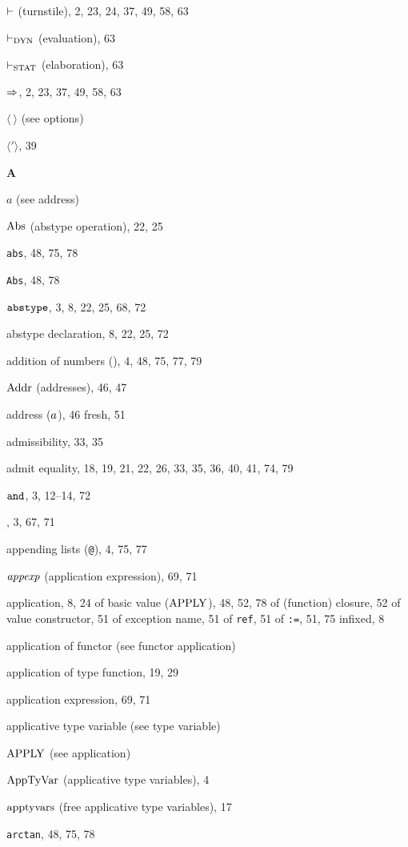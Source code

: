 \begin{theindex}
\item $\vdash$ (turnstile), 2, 23, 24, 37, 49, 58, 63
\item $\vdash_{\rm DYN}$ (evaluation), 63
\item $\vdash_{\rm STAT}$ (elaboration), 63
\item $\Rightarrow$, 2, 23, 37, 49, 58, 63
\item $\langle\ \rangle$ (see options) 
\item $\langle'\rangle$, 39
\indexspace
\parbox{65mm}{\hfil{\large\bf A}\hfil}
\indexspace
\item $a$ (see address) 
\item $\mathop{\rm Abs}\nolimits$ (abstype operation), 22, 25
\item {\tt abs}, 48, 75, 78
\item {\tt Abs}, 48, 78
\item ${\tt abstype}$, 3, 8, 22, 25, 68, 72
\item abstype declaration, 8, 22, 25, 72
\item addition of numbers (\ml{+}), 4, 48, 75, 77, 79
\item ${\rm Addr}$ (addresses), 46, 47
\item address ($a$), 46
\subitem fresh, 51
\item admissibility, 33, 35
\item admit equality, 18, 19, 21, 22, 26, 33, 35, 36, 40, 41, 74, 79
\item ${\tt and}$, 3, 12--14, 72
\item \ANDALSO, 3, 67, 71
\item appending lists (\verb+@+), 4, 75, 77
\item ${\it appexp}$ (application expression), 69, 71
\item application, 8, 24
\subitem of basic value (${\rm APPLY}$), 48, 52, 78
\subitem of (function) closure, 52
\subitem of value constructor, 51
\subitem of exception name, 51
\subitem of {\tt ref}, 51
\subitem of {\tt :=}, 51, 75
\subitem infixed, 8
\item application of functor (see functor application) 
\item application of type function, 19, 29
\item application expression, 69, 71
\item applicative type variable (see type variable) 
\item ${\rm APPLY}$ (see application) 
\item ${\rm AppTyVar}$ (applicative type variables), 4
\item $\mathop{\rm apptyvars}\nolimits$ (free applicative type variables), 17
\item {\tt arctan}, 48, 75, 78

\end{theindex}
